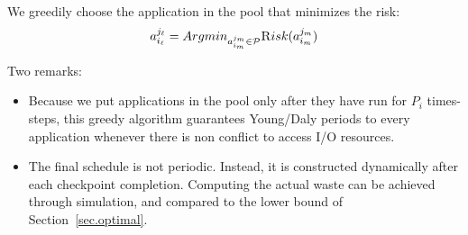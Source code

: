 \documentclass{article}
\newcommand{\application}[2]{a_{#1}^{#2}}
\newcommand{\nbnodes}[1]{q_{#1}}
\newcommand{\period}[1]{P_{#1}}
\newcommand{\lastckpt}[2]{L_{#1}^{#2}}
\newcommand{\wastefct}[2]{W_{#1}(#2)}
\newcommand{\pool}{{\mathcal P}}
\newcommand{\risk}{{\textsc Risk}}
\begin{document}
We greedily choose the application in the pool that minimizes the risk:
$$\application{i_{\ell}}{j_{\ell}} = Argmin_{\application{i_m}{j_m} \in \pool} \risk(\application{i_m}{j_m})$$


Two remarks:
\begin{itemize}
\item Because we put applications in the pool only after they have run for $P_{i}$ times-steps,
this greedy algorithm guarantees Young/Daly periods to every application
whenever there is non conflict to access I/O resources.
\item The final schedule is not periodic. Instead, it is constructed dynamically
after each checkpoint completion. Computing the actual waste can be achieved 
through simulation, and compared to the lower bound of Section~\ref{sec.optimal}. 
\end{itemize}




\end{document}
